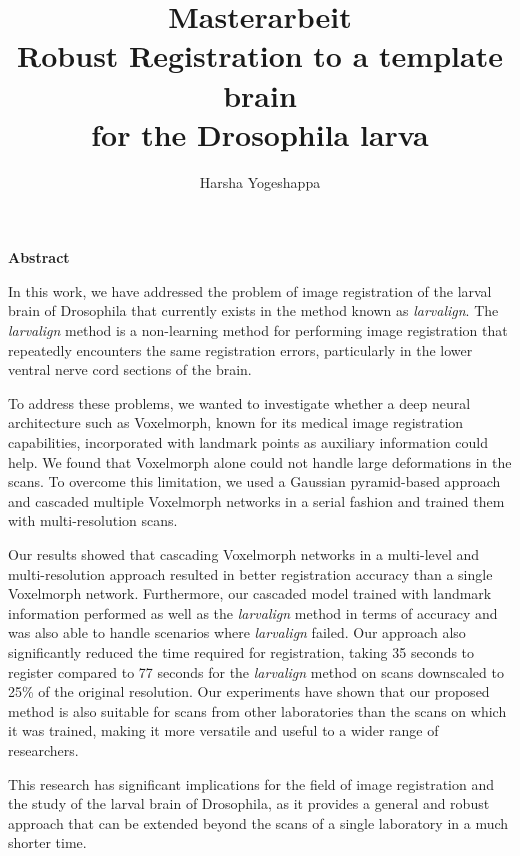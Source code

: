 \documentclass{book}
\title{
	Masterarbeit \\
	Robust Registration to a template brain  \\
	for the Drosophila larva \large }
\author{Harsha Yogeshappa}
\begin{document}
	\maketitle
	\cleardoublepage
	\newpage
	\vspace*{\fill}
	\begin{center}
		{\Large \textcolor{rwth-blue-1}{\textbf{Abstract}}}
	\end{center}
	In this work, we have addressed the problem of image registration of the larval brain of Drosophila that currently exists in the method known as \textit{larvalign}. The \textit{larvalign} method is a non-learning method for performing image registration that repeatedly encounters the same registration errors, particularly in the lower ventral nerve cord sections of the brain.
	
	To address these problems, we wanted to investigate whether a deep neural architecture such as Voxelmorph, known for its medical image registration capabilities, incorporated with landmark points as auxiliary information could help. We found that Voxelmorph alone could not handle large deformations in the scans. To overcome this limitation, we used a Gaussian pyramid-based approach and cascaded multiple Voxelmorph networks in a serial fashion and trained them with multi-resolution scans.
	
	Our results showed that cascading Voxelmorph networks in a multi-level and multi-resolution approach resulted in better registration accuracy than a single Voxelmorph network. Furthermore, our cascaded model trained with landmark information performed as well as the \textit{larvalign} method in terms of accuracy and was also able to handle scenarios where \textit{larvalign} failed. Our approach also significantly reduced the time required for registration, taking 35 seconds to register compared to 77 seconds for the \textit{larvalign} method on scans downscaled to 25\% of the original resolution. Our experiments have shown that our proposed method is also suitable for scans from other laboratories than the scans on which it was trained, making it more versatile and useful to a wider range of researchers.
	
	This research has significant implications for the field of image registration and the study of the larval brain of Drosophila, as it provides a general and robust approach that can be extended beyond the scans of a single laboratory in a much shorter time.
	\vspace*{\fill}
	
	\newpage
	
\end{document}
